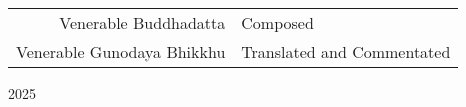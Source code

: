 \begin{titlepage}
	{\scshape\Large \begin{table}[h]
	\centering
	\begin{tabular}{rl}
		Venerable Buddhadatta & Composed \\
		Venerable Gunodaya Bhikkhu  &  Translated and Commentated
	\end{tabular}
\end{table}
} %
	
	\vspace{0.5\baselineskip} %
	
	
	\vfill %
	
	
	\plogo %
	
	\vspace{0.3\baselineskip} %
	
	2025 %
	

\end{titlepage}

%
